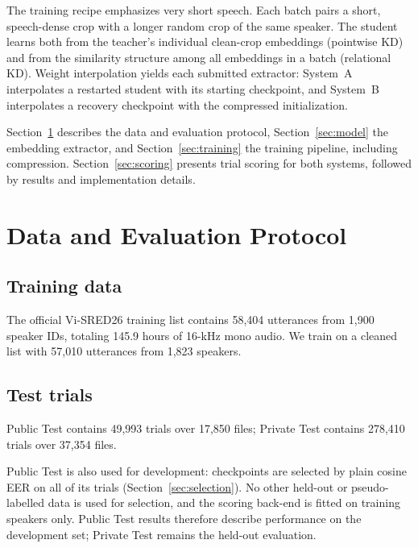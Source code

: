 \documentclass[11pt]{article}
\begin{document}
The training recipe emphasizes very short speech. Each batch pairs a short, speech-dense crop with a longer random crop of the same speaker. The student learns both from the teacher's individual clean-crop embeddings (pointwise KD) and from the similarity structure among all embeddings in a batch (relational KD). Weight interpolation yields each submitted extractor: System~A interpolates a restarted student with its starting checkpoint, and System~B interpolates a recovery checkpoint with the compressed initialization.

Section~\ref{sec:data} describes the data and evaluation protocol, Section~\ref{sec:model} the embedding extractor, and Section~\ref{sec:training} the training pipeline, including compression. Section~\ref{sec:scoring} presents trial scoring for both systems, followed by results and implementation details.

\section{Data and Evaluation Protocol}
\label{sec:data}
\subsection{Training data}
The official Vi-SRED26 training list contains 58,404 utterances from 1,900 speaker IDs, totaling 145.9 hours of 16-kHz mono audio. We train on a cleaned list with 57,010 utterances from 1,823 speakers.

\subsection{Test trials}
Public Test contains 49,993 trials over 17,850 files; Private Test contains 278,410 trials over 37,354 files.

Public Test is also used for development: checkpoints are selected by plain cosine EER on all of its trials (Section~\ref{sec:selection}). No other held-out or pseudo-labelled data is used for selection, and the scoring back-end is fitted on training speakers only. Public Test results therefore describe performance on the development set; Private Test remains the held-out evaluation.
\end{document}
